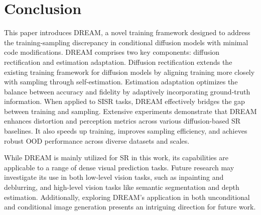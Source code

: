 \section{Conclusion}
This paper introduces DREAM, a novel training framework designed to address the training-sampling discrepancy in conditional diffusion models with minimal code modifications. DREAM comprises two key components: diffusion rectification and estimation adaptation. Diffusion rectification extends the existing training framework for diffusion models by aligning training more closely with sampling through self-estimation. Estimation adaptation optimizes the balance between accuracy and fidelity by adaptively incorporating ground-truth information. When applied to SISR tasks, DREAM effectively bridges the gap between training and sampling. Extensive experiments demonstrate that DREAM enhances distortion and perception metrics across various diffusion-based SR baselines. It also speeds up training, improves sampling efficiency, and achieves robust OOD performance across diverse datasets and scales. 

While DREAM is mainly utilized for SR in this work, its capabilities are applicable to a range of dense visual prediction tasks. Future research may investigate its use in both low-level vision tasks, such as inpainting and deblurring, and high-level vision tasks like semantic segmentation and depth estimation. Additionally, exploring DREAM's application in both unconditional and conditional image generation presents an intriguing direction for future work.


